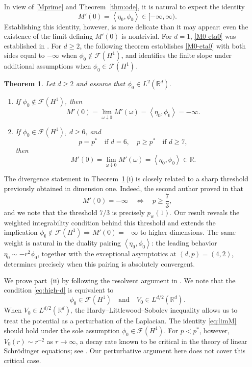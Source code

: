 \documentclass[12pt, a4paper, reqno]{amsart}
\numberwithin{equation}{section}
\newtheorem{theorem}{Theorem}[section]
\theoremstyle{definition}
\theoremstyle{remark}
\newcommand{\R}{\mathbb R}
\newcommand{\cF}{\mathcal F}
\def\tbra[#1,#2]{{\left\langle #1,#2\right\rangle}}
\newcommand{\ce}{\mathrel{\mathop:}=}
\begin{document}
In view of \eqref{Mprime} and Theorem~\ref{thm:ode}, it is natural to expect the identity
\begin{equation}
\label{M0-eta0}
  M'(0)=\tbra[\eta_0,\phi_0]\in[-\infty,\infty).
\end{equation}
Establishing this identity, however, is more delicate than it may appear:
even the existence of the limit defining $M'(0)$ is nontrivial.
For $d=1$, \eqref{M0-eta0} was established in
\cite[Theorem~3.1]{FH25}.
For $d\ge2$, the following theorem establishes \eqref{M0-eta0}
with both sides equal to $-\infty$ when $\phi_0\notin\cF(H^1)$,
and identifies the finite slope under additional assumptions when
$\phi_0\in\cF(H^1)$.
\begin{theorem}\label{thm:res}
Let $d\ge2$ and assume that $\phi_0\in L^2(\R^d)$.
\begin{enumerate}[beginpenalty=10000]
\item If $\phi_0\notin\cF(H^1)$, then
\[
  M'(0)=\lim_{\omega\downarrow0}M'(\omega)
  =\tbra[\eta_0,\phi_0]=-\infty.
\]

\item If $\phi_0\in\cF(H^1)$, $d\ge6$, and
\begin{equation}\label{eq:high-d}
  p=p^* \quad\text{if }d=6,
  \quad
  p\ge p^* \quad\text{if }d\ge7,
\end{equation}
then
\begin{equation}\label{eq:limM}
  M'(0)=\lim_{\omega\downarrow0}M'(\omega)
  =\tbra[\eta_0,\phi_0]\in\R.
\end{equation}
\end{enumerate}
\end{theorem}

The divergence statement in Theorem~\ref{thm:res}\,\textup{(i)} is closely related to a sharp threshold previously obtained in dimension one. Indeed, the second author proved in \cite{H21} that
\[
  M'(0)=-\infty\quad\Longleftrightarrow\quad p\ge\frac73,
\]
and we note that the threshold $7/3$ is precisely $p_{\mathrm w}(1)$. Our result
reveals the weighted integrability condition behind this
threshold and extends the implication
$\phi_0\notin\cF(H^1)\Rightarrow M'(0)=-\infty$ to higher
dimensions. The same weight is natural in the duality pairing
$\tbra[\eta_0,\phi_0]$: the leading behavior
$\eta_0\sim-r^2\phi_0$, together with the exceptional asymptotics
at $(d,p)=(4,2)$, determines precisely when this pairing is
absolutely convergent.

We prove part~\textup{(ii)} by following the resolvent argument in \cite[Section~4.5]{LN20}.
We note that the condition \eqref{eq:high-d} is equivalent to
\[
  \phi_0\in\cF(H^1)
  \quad\text{and}\quad
  V_0\in L^{d/2}(\R^d).
\]
When $V_0\in L^{d/2}(\R^d)$, the Hardy--Littlewood--Sobolev inequality
allows us to treat the potential as a perturbation of the Laplacian.
The identity \eqref{eq:limM} should hold under the sole assumption
$\phi_0\in\cF(H^1)$.
For $p<p^*$, however, $V_0(r)\sim r^{-2}$ as $r\to\infty$,
a decay rate known to be critical in the theory of linear
Schr\"odinger equations; see \cite{BPST04,GVV06}.
Our perturbative argument here does not cover this critical case.
\end{document}
